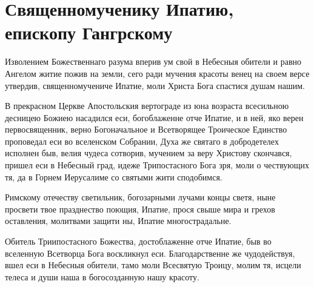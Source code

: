 \section{Священномученику Ипатию, епископу Гангрскому}\begin{mymulticols}


Изволением Божественнаго разума вперив ум свой в Небесныя обители и равно Ангелом житие пожив на земли, сего ради мучения красоты венец на своем версе утвердив, священномучениче Ипатие, моли Христа Бога спастися душам нашим.


В прекрасном Церкве Апостольския вертограде из юна возраста всесильною десницею Божиею насадился еси, богоблаженне отче Ипатие, и в ней, яко верен первосвященник, верно Богоначальное и Всетворящее Троическое Единство проповедал еси во вселенском Собрании, Духа же святаго в добродетелех исполнен быв, велия чудеса сотворив, мучением за веру Христову скончався, пришел еси в Небесный град, идеже Трипостасного Бога зря, моли о чествующих тя, да в Горнем Иерусалиме со святыми жити сподобимся.


Римскому отечеству светильник, богозарными лучами концы светя, ныне просвети твое празднество поющия, Ипатие, прося свыше мира и грехов оставления, молитвами защити ны, Ипатие многострадальне.


Обитель Триипостасного Божества, достоблаженне отче Ипатие, быв во вселенную Всетворца Бога воскликнул еси. Благодарственне же чудодействуя, вшел еси в Небесныя обители, тамо моли Всесвятую Троицу, молим тя, исцели телеса и души наша в богосозданную нашу красоту.



\end{mymulticols}
